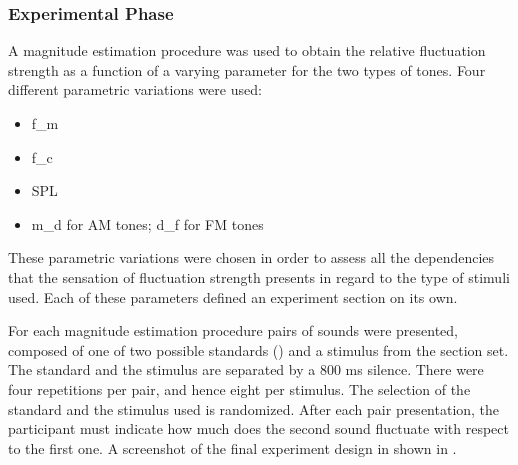 \documentclass[../main.tex]{subfiles}
\begin{document}
\subsubsection{Experimental Phase}
\label{subsub:experimental_phase}


A magnitude estimation procedure was used to obtain the relative fluctuation
strength as a function of a varying parameter for the two types of tones. Four
different parametric variations were used:
\begin{itemize}
  \item \Gls{f_m}
  \item \Gls{f_c}
  \item \Gls{SPL}
  \item \Gls{m_d} for \gls{AM} tones; \gls{d_f} for \gls{FM} tones
\end{itemize}
These parametric variations were chosen in order to assess all the dependencies
that the sensation of fluctuation strength presents in regard to the type of
stimuli used. Each of these parameters defined an experiment section on its own.

For each magnitude estimation procedure pairs of sounds were presented, composed
of one of two possible standards () and a stimulus from the
section set. The standard and the stimulus are separated by a 800 ms silence.
There were four repetitions per pair, and hence eight per stimulus. The
selection of the standard and the stimulus used is randomized. After each
pair presentation, the participant must indicate how much does the second
sound fluctuate with respect to the first one. A screenshot of the final
experiment design in shown in .
\end{document}
